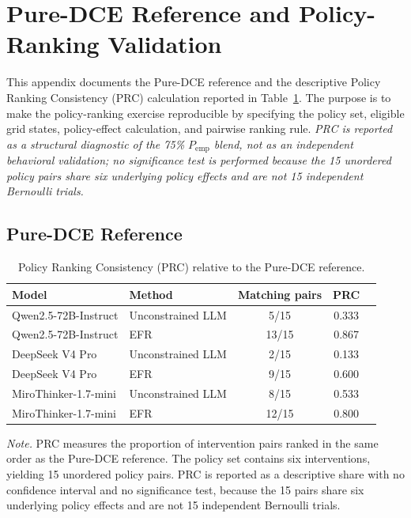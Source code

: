 \documentclass[11pt]{article}
\begin{document}
\section{Pure-DCE Reference and Policy-Ranking Validation}\label{sec:heldout_validation}
\label{app:pure_dce_prc}

This appendix documents the Pure-DCE reference and the descriptive Policy Ranking Consistency (PRC) calculation reported in Table~\ref{tab:S11}. The purpose is to make the policy-ranking exercise reproducible by specifying the policy set, eligible grid states, policy-effect calculation, and pairwise ranking rule. \emph{PRC is reported as a structural diagnostic of the 75\% $P_{\text{emp}}$ blend, not as an independent behavioral validation; no significance test is performed because the 15 unordered policy pairs share six underlying policy effects and are not 15 independent Bernoulli trials.}

\subsection{Pure-DCE Reference}

\begin{table}[t]
\centering
\caption{Policy Ranking Consistency (PRC) relative to the Pure-DCE reference.}
\label{tab:S11}
\small
\setlength{\tabcolsep}{5pt}
\begin{tabular}{l l c c c}
\toprule
Model & Method & Matching pairs & PRC \\
\midrule
Qwen2.5-72B-Instruct & Unconstrained LLM & 5/15 & 0.333 \\
Qwen2.5-72B-Instruct & EFR & 13/15 & 0.867 \\
\midrule
DeepSeek V4 Pro & Unconstrained LLM & 2/15 & 0.133 \\
DeepSeek V4 Pro & EFR & 9/15 & 0.600 \\
\midrule
MiroThinker-1.7-mini & Unconstrained LLM & 8/15 & 0.533 \\
MiroThinker-1.7-mini & EFR & 12/15 & 0.800 \\
\bottomrule
\end{tabular}

\vspace{0.4em}
\begin{minipage}{0.95\textwidth}
\small
\textit{Note.} PRC measures the proportion of intervention pairs ranked in the same order as the Pure-DCE reference. The policy set contains six interventions, yielding 15 unordered policy pairs. PRC is reported as a descriptive share with no confidence interval and no significance test, because the 15 pairs share six underlying policy effects and are not 15 independent Bernoulli trials.
\end{minipage}
\end{table}
\end{document}
